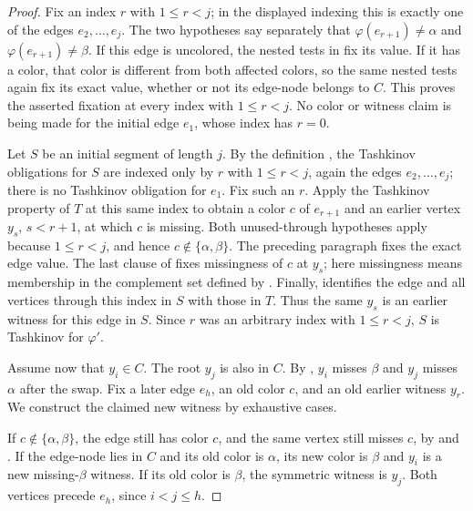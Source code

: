 \begin{proof}
Fix an index \(r\) with \(1\le r<j\); in the displayed indexing this is
exactly one of the edges \(e_2,\ldots,e_j\).  The two
 hypotheses say separately that
\(\varphi(e_{r+1})\ne\alpha\) and
\(\varphi(e_{r+1})\ne\beta\).  If this edge is uncolored, the nested
tests in  fix its value.  If it has a
color, that color is different from both affected colors, so the same
nested tests again fix its exact value, whether or not its edge-node
belongs to \(C\).  This proves the asserted fixation at every index
with \(1\le r<j\).  No color or witness claim is being made for the
initial edge \(e_1\), whose index has \(r=0\).

Let \(S\) be an initial segment of length \(j\).  By the definition
, the Tashkinov obligations for \(S\) are indexed
only by \(r\) with \(1\le r<j\), again the edges
\(e_2,\ldots,e_j\); there is no Tashkinov obligation for \(e_1\).
Fix such an \(r\).  Apply the Tashkinov property of \(T\) at this same
index to obtain a color \(c\) of \(e_{r+1}\) and an earlier vertex
\(y_s\), \(s<r+1\), at which \(c\) is missing.  Both unused-through
hypotheses apply because \(1\le r<j\), and hence
\(c\notin\{\alpha,\beta\}\).  The preceding paragraph fixes the exact
edge value.  The last clause of
 fixes missingness of
\(c\) at \(y_s\); here missingness means membership in the complement
set defined by .  Finally,
 identifies the edge and all
vertices through this index in \(S\) with those in \(T\).  Thus the
same \(y_s\) is an earlier witness for this edge in \(S\).  Since \(r\)
was an arbitrary index with \(1\le r<j\), \(S\) is Tashkinov for
\(\varphi'\).

Assume now that \(y_i\in C\).  The root \(y_j\) is also in \(C\).
By , \(y_i\) misses
\(\beta\) and \(y_j\) misses \(\alpha\) after the swap.  Fix a later
edge \(e_h\), an old color \(c\), and an old earlier witness \(y_r\).
We construct the claimed new witness by exhaustive cases.

If \(c\notin\{\alpha,\beta\}\), the edge still has color \(c\), and
the same vertex still misses \(c\), by
 and
.  If the edge-node lies
in \(C\) and its old color is \(\alpha\), its new color is \(\beta\)
and \(y_i\) is a new missing-\(\beta\) witness.  If its old color is
\(\beta\), the symmetric witness is \(y_j\).  Both vertices precede
\(e_h\), since \(i<j\le h\).


\end{proof}
